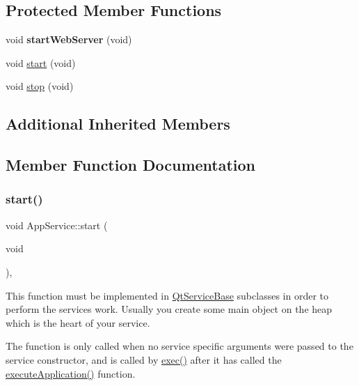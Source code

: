 \subsection*{Protected Member Functions}
\begin{DoxyCompactItemize}
\item 
\mbox{\label{class_app_service_aef117ff830f4d07806f22a352edf9fd6}} 
void {\bfseries start\+Web\+Server} (void)
\item 
void \hyperlink{class_app_service_a987c81ba936b7ce15b84cba99851dabb}{start} (void)
\item 
void \hyperlink{class_app_service_a343b5fb7522b24f9fc6dd2aeda940f01}{stop} (void)
\end{DoxyCompactItemize}
\subsection*{Additional Inherited Members}


\subsection{Member Function Documentation}
\mbox{\label{class_app_service_a987c81ba936b7ce15b84cba99851dabb}} 
\subsubsection{\texorpdfstring{start()}{start()}}
{\footnotesize\ttfamily void App\+Service\+::start (\begin{DoxyParamCaption}\item[{void}]{ }\end{DoxyParamCaption})\hspace{0.3cm}{\ttfamily [protected]}, {\ttfamily [virtual]}}

This function must be implemented in \hyperlink{class_qt_service_base}{Qt\+Service\+Base} subclasses in order to perform the service\textquotesingle{}s work. Usually you create some main object on the heap which is the heart of your service.

The function is only called when no service specific arguments were passed to the service constructor, and is called by \hyperlink{class_qt_service_base_afae2e589de71c1ae3ae8db3dc9ab9c64}{exec()} after it has called the \hyperlink{class_qt_service_a84f5f60304117e1f11cc0ed16dc0b72e}{execute\+Application()} function.

